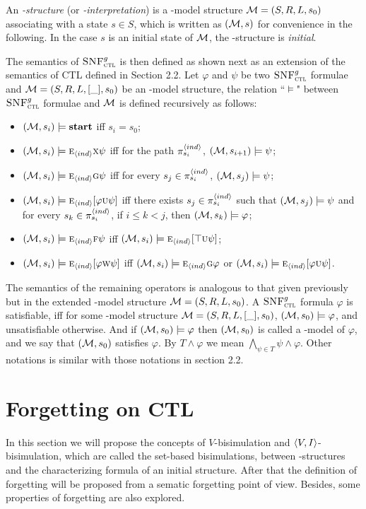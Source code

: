 \documentclass{article}
\begin{document}
An {\em \Ind-structure} (or {\em \Ind-interpretation}) is a \Ind-model structure
${\cal M}=(S, R, L, s_0)$ associating
with a state $s\in S$, which is written as $({\cal M},s)$ for convenience in the following.
In the case $s$ is an initial state of $\cal M$, the \Ind-structure is {\em initial}.

The semantics of ${\textsc{SNF}_{\textsc{ctl}}^g}$ is then
defined as shown next as an extension of the semantics of CTL defined in Section 2.2. Let $\varphi$ and $\psi$ be two ${\textsc{SNF}_{\textsc{ctl}}^g}$ formulae and ${\cal M}=(S,R,L,[\_],s_0)$ be an \Ind-model structure, the relation ``$\models$" between ${\textsc{SNF}_{\textsc{ctl}}^g}$ formulae and ${\cal M}$ is defined recursively as follows:
\begin{itemize}
  \item $({\cal M},s_i) \models \textbf{start}$ iff $s_i=s_0$;
  \item $({\cal M},s_i)\models \textsc{e}_{{\langle{ind}\rangle}} \textsc{x} \psi$ iff for the path $\pi_{s_i}^{{\langle{ind}\rangle}}$, $({\cal M}, s_{i+1})\models \psi$;
  \item $({\cal M},s_i)\models \textsc{e}_{{\langle{ind}\rangle}}\textsc{g}\psi$ iff
    for every $s_j \in \pi_{s_i}^{{\langle{ind}\rangle}}$,
    $({\cal M},s_j) \models \psi$;
  \item $({\cal M},s_i)\models \textsc{e}_{{\langle{ind}\rangle}}[\varphi\textsc{u}\psi]$ iff
      there exists $s_j\in \pi_{s_i}^{{\langle{ind}\rangle}}$ such that $({\cal M},s_j) \models \psi$ and for every $s_k \in \pi_{s_i}^{{\langle{ind}\rangle}}$, if $i\leq k < j$, then $({\cal M},s_k) \models \varphi$;
  \item $({\cal M},s_i) \models \textsc{e}_{{\langle{ind}\rangle}} \textsc{f} \psi$ iff $({\cal M},s_i) \models \textsc{e}_{{\langle{ind}\rangle}}[\top \textsc{u}\psi]$;
  \item $({\cal M},s_i)\models \textsc{e}_{{\langle{ind}\rangle}}[\varphi\textsc{w}\psi]$ iff $({\cal M},s_i) \models \textsc{e}_{{\langle{ind}\rangle}}\textsc{g} \varphi$ or $({\cal M},s_i)\models \textsc{e}_{{\langle{ind}\rangle}}[\varphi\textsc{u}\psi]$.
\end{itemize}
The semantics of the remaining operators is analogous to that given previously but in the
extended \Ind-model structure ${\cal M}=(S, R, L, s_0)$.
A ${\textsc{SNF}_{\textsc{ctl}}^g}$ formula $\varphi$ is satisfiable, iff for some \Ind-model structure ${\cal M}=(S,R,L,[\_],s_0)$, $({\cal M},s_0)\models \varphi$, and unsatisfiable otherwise. And if $({\cal M},s_0)\models \varphi$ then $({\cal M},s_0)$ is called a \Ind-model of $\varphi$, and we say that $({\cal M},s_0)$ satisfies $\varphi$.
By $T \wedge \varphi$ we mean $\bigwedge_{\psi\in T} \psi \wedge \varphi$.
Other notations is similar with those notations in section 2.2.


\section{Forgetting on CTL}
In this section we will propose the concepts of $V$-bisimulation and ${\langle{V,I}\rangle}$-bisimulation, which are called the set-based bisimulations, between \MPK-structures and the characterizing formula of an initial structure. After that the definition of forgetting will be proposed from a sematic forgetting point of view. Besides, some properties of forgetting are also explored.
\end{document}
